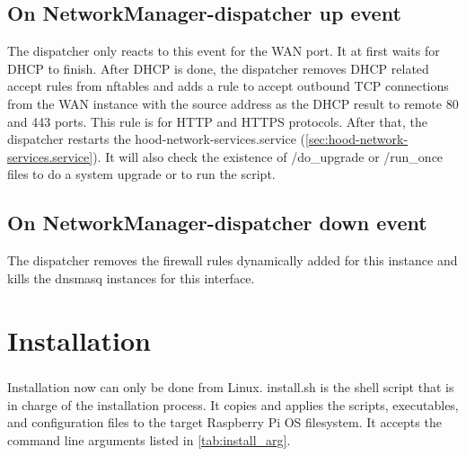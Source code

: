 \documentclass[mscthesis]{usiinfthesis}
\begin{document}
\section{On NetworkManager-dispatcher up event}
The dispatcher only reacts to this event for the WAN port. It at first waits for DHCP to finish. After DHCP is done, the dispatcher removes DHCP related accept rules from nftables and adds a rule to accept outbound TCP connections from the WAN instance with the source address as the DHCP result to remote 80 and 443 ports. This rule is for HTTP and HTTPS protocols. After that, the dispatcher restarts the hood-network-services.service (\cref{sec:hood-network-services.service}). It will also check the existence of /do\_upgrade or /run\_once files to do a system upgrade or to run the script.

\section{On NetworkManager-dispatcher down event}
The dispatcher removes the firewall rules dynamically added for this instance and kills the dnsmasq instances for this interface.

\chapter{Installation}
\paragraph{}
Installation now can only be done from Linux. install.sh is the shell script that is in charge of the installation process. It copies and applies the scripts, executables, and configuration files to the target Raspberry Pi OS filesystem. It accepts the command line arguments listed in \cref{tab:install_arg}.
\end{document}
